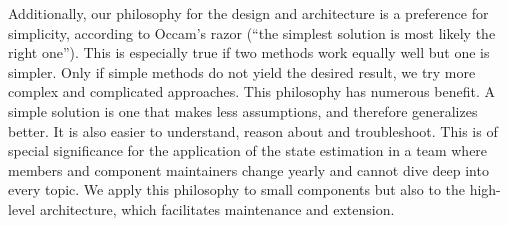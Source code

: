 Additionally, our philosophy for the design and architecture is a preference for simplicity, according to Occam's razor (\enquote{the simplest solution is most likely the right one}). This is especially true if two methods work equally well but one is simpler. Only if simple methods do not yield the desired result, we try more complex and complicated approaches. This philosophy has numerous benefit. A simple solution is one that makes less assumptions, and therefore generalizes better. It is also easier to understand, reason about and troubleshoot. This is of special significance for the application of the state estimation in a team where members and component maintainers change yearly and cannot dive deep into every topic. We apply this philosophy to small components but also to the high-level architecture, which facilitates maintenance and extension.
